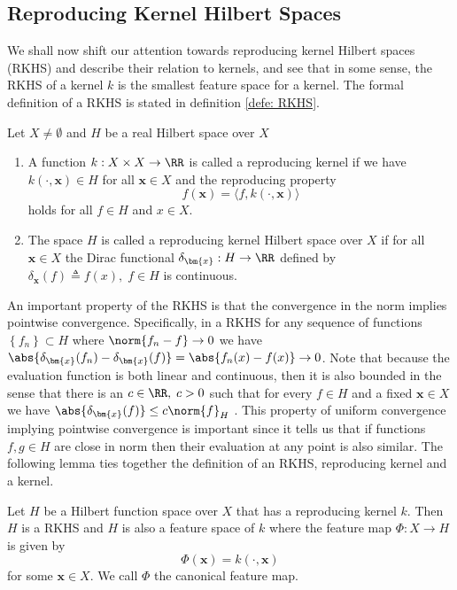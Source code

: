 \subsection{Reproducing Kernel Hilbert Spaces}\label{Section1.2}

We shall now shift our attention towards reproducing kernel Hilbert spaces (RKHS) and describe their relation to kernels, and see that in some sense, the RKHS of a kernel $k$ is the smallest feature space for a kernel. The formal definition of a RKHS is stated in definition \ref{defe: RKHS}.

\begin{defe}[RKHS] \label{defe: RKHS}
    Let $X \neq \emptyset$ and $H$ be a real Hilbert space over $X$
    \begin{enumerate}
        \item A function $k : X \times X \to \RR$ is called a reproducing kernel if we have $k \left( \cdot, \bm{x} \right) \in H$ for all $\bm{x} \in X$ and the reproducing property
              \[
                  f(\bm{x}) = \langle f , k \left( \cdot, \bm{x} \right) \rangle
              \]
              holds for all $f \in H$ and $x \in X$.
        \item The space $H$ is called a reproducing kernel Hilbert space over $X$ if for all $\bm{x} \in X$ the Dirac functional $\delta_{\bm{x}} : H \to \RR$ defined by $\delta_{\bm{x}} (f) \triangleq f(x), \; f \in H$ is continuous.
    \end{enumerate}
    \cite{SteinwartIngo2008SVMb}
\end{defe}

An important property of the RKHS is that the convergence in the norm implies pointwise convergence. Specifically, in a RKHS for any sequence of functions $\left\{ f_n \right\} \subset H$ where $\norm{f_n - f} \to 0$ we have $\abs{\delta_{\bm{x}} (f_n) - \delta_{\bm{x}} (f)} = \abs{f_n (x) - f (x)} \to 0$. Note that because the evaluation function is both linear and continuous, then it is also bounded in the sense that there is an $c \in \RR, \; c > 0$ such that for every $f \in H$ and a fixed $\bm{x} \in X$ we have $\abs{\delta_{\bm{x}} (f)} \leq c \norm{f}_H$ \cite{BerezanskyMakarovich1996FaV1}. This property of uniform convergence implying pointwise convergence is important since it tells us that if functions $f,g \in H$ are close in norm then their evaluation at any point is also similar. The following lemma ties together the definition of an RKHS, reproducing kernel and a kernel.

\begin{lem}[] \label{lem: RKHS_rk_k}
    Let $H$ be a Hilbert function space over $X$ that has a reproducing kernel $k$. Then $H$ is a RKHS and $H$ is also a feature space of $k$ where the feature map $\Phi : X \to H$ is given by
    \[
        \Phi (\bm{x}) = k \left( \cdot , \bm{x}  \right)
    \]
    for some $\bm{x} \in X$. We call $\Phi$ the canonical feature map.
\end{lem}

